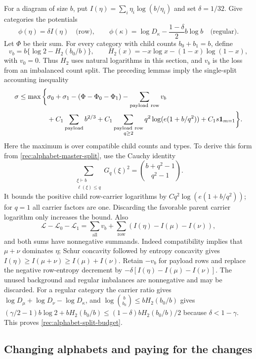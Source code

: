 For a diagram of size $b$, put
$I(\eta)=\sum_i\eta_i\log(b/\eta_i)$ and set $\delta=1/32$.
Give categories the potentials
\begin{equation}\label{rec:alphabet-potentials}
 \phi(\eta)=\delta I(\eta)\quad\text{(row)},\qquad
 \phi(\kappa)=\log D_\kappa-\frac{1-\delta}{2}b\log b
                                     \quad\text{(regular)}.
\end{equation}
Let $\Phi$ be their sum.  For every category with child counts $b_0+b_1=b$, define
\[
 v_b=b\{\log2-H_2(b_0/b)\},\qquad
 H_2(x)=-x\log x-(1-x)\log(1-x),
\]
with $v_0=0$.  Thus $H_2$ uses natural logarithms in this section,
and $v_b$ is the loss from an imbalanced count split.
The preceding lemmas imply the single-split accounting inequality
\begin{align}
 \sigma\le\max\bigg\{&\sigma_0+\sigma_1
 -(\Phi-\Phi_0-\Phi_1)-\sum_{\mathrm{payload\ row}}v_b
 \notag\\
 &+C_1\sum_{\mathrm{payload}}b^{2/3}
 +C_1\sum_{\substack{\mathrm{payload\ row}\\q\ge2}}
       q^2\log(e(1+b/q^2))+C_1s\mathbf1_{m=1}\bigg\}.
       \label{rec:alphabet-split-budget}
\end{align}
Here the maximum is over compatible child counts and types.
To derive this form from \eqref{rec:alphabet-master-split}, use the
Cauchy identity
\[
 \sum_{\substack{\xi\vdash b\\\ell(\xi)\le q}}G_q(\xi)^2
       =\binom{b+q^2-1}{q^2-1}.
\]
It bounds the positive child row-carrier logarithms by
$Cq^2\log(e(1+b/q^2))$; for $q=1$ all carrier factors are one.
Discarding the favorable parent carrier logarithm only increases
the bound.  Also
\[
 \mathcal L-\mathcal L_0-\mathcal L_1
 =\sum_{\mathrm{all}}v_b+
   \sum_{\mathrm{row}}(I(\eta)-I(\mu)-I(\nu)),
\]
and both sums have nonnegative summands.  Indeed compatibility implies
that $\mu+\nu$ dominates $\eta$; Schur concavity followed by entropy
concavity gives $I(\eta)\ge I(\mu+\nu)\ge I(\mu)+I(\nu)$.
Retain $-v_b$ for payload rows and replace the negative row-entropy
decrement by $-\delta[I(\eta)-I(\mu)-I(\nu)]$.  The unused
background and regular imbalances are nonnegative and may be discarded.
For a regular category the carrier ratio gives
$\log D_\mu+\log D_\nu-\log D_\kappa$, and
$\log\binom b{b_0}\le bH_2(b_0/b)$ gives
$(\gamma/2-1)b\log2+bH_2(b_0/b)
\le(1-\delta)bH_2(b_0/b)/2$ because $\delta<1-\gamma$.
This proves \eqref{rec:alphabet-split-budget}.

\subsection{Changing alphabets and paying for the changes}

